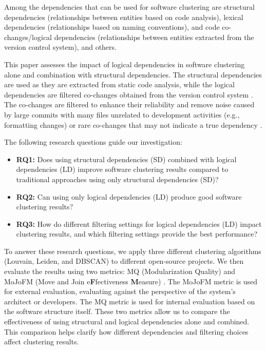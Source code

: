 \documentclass[12pt, a4paper, twoside]{report}
\begin{document}
Among the dependencies that can be used for software clustering are structural dependencies (relationships between entities based on code analysis), lexical dependencies (relationships based on naming conventions), and code co-changes/logical dependencies (relationships between entities extracted from the version control system), and others.

This paper assesses the impact of logical dependencies in software clustering alone and combination with structural dependencies. The structural dependencies are used as they are extracted from static code analysis, while the logical dependencies are filtered co-changes obtained from the version control system \cite{b15}. The co-changes are filtered to enhance their reliability and remove noise caused by large commits with many files unrelated to development activities (e.g., formatting changes) or rare co-changes that may not indicate a true dependency \cite{b1}.

The following research questions guide our investigation:

\begin{itemize}
\item \textbf{RQ1:} Does using structural dependencies (SD) combined with logical dependencies (LD) improve software clustering results compared to traditional approaches using only structural dependencies (SD)?
\item \textbf{RQ2:} Can using only logical dependencies (LD) produce good software clustering results?
\item \textbf{RQ3:} How do different filtering settings for logical dependencies (LD) impact clustering results, and which filtering settings provide the best performance?
\end{itemize}

To answer these research questions, we apply three different clustering algorithms (Louvain, Leiden, and DBSCAN) to different open-source projects. We then evaluate the results using two metrics: MQ (Modularization Quality) \cite{b10} and MoJoFM (Move and Join e\textbf{F}fectiveness \textbf{M}easure) \cite{mojofm}. The MoJoFM metric is used for external evaluation, evaluating against the perspective of the system's architect or developers. The MQ metric is used for internal evaluation based on the software structure itself. These two metrics allow us to compare the effectiveness of using structural and logical dependencies alone and combined. This comparison helps clarify how different dependencies and filtering choices affect clustering results.
\end{document}
